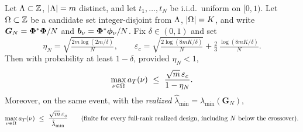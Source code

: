 \begin{theorem}\label{thm:u1}
Let $\Lambda\subset\mathbb{Z}$, $|\Lambda|=m$ distinct, and let $t_1,\dots,t_N$ be i.i.d.\ uniform on
$[0,1)$.  Let $\Omega\subset\mathbb{Z}$ be a candidate set integer-disjoint from $\Lambda$, $|\Omega|=K$, and
write $\bm G_N=\bm{\Phi}^{*}\bm{\Phi}/N$ and $\bm b_\nu=\bm{\Phi}^{*}\bm\phi_\nu/N$.  Fix
$\delta\in(0,1)$ and set
\[
\eta_N=\sqrt{\tfrac{2m\log(2m/\delta)}{N}},\qquad
\varepsilon_c=\sqrt{\tfrac{2\log(8mK/\delta)}{N}}+\tfrac23\,\tfrac{\log(8mK/\delta)}{N}.
\]
Then with probability at least $1-\delta$, provided $\eta_N<1$,
\begin{equation}\label{eq:u1-apriori}
\max_{\nu\in\Omega}a_T(\nu)\ \le\ \frac{\sqrt m\,\varepsilon_c}{1-\eta_N}.
\end{equation}
Moreover, on the same event, with the \emph{realized} $\hat\lambda_{\min}=\lambda_{\min}(\bm
G_N)$,
\begin{equation}\label{eq:u1-datadep}
\max_{\nu\in\Omega}a_T(\nu)\ \le\ \frac{\sqrt m\,\varepsilon_c}{\hat\lambda_{\min}}
\qquad\text{(finite for every full-rank realized design, including $N$ below the crossover).}
\end{equation}
\end{theorem}

